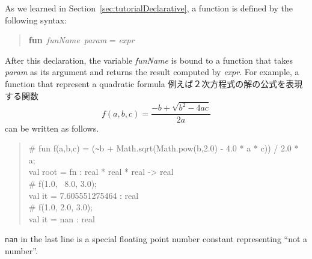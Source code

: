 \documentclass{jbook}
\newcommand{\txt}[2]{#2}
\newenvironment{program}{\begin{tt}\begin{quote}}{\end{quote}\end{tt}}
\begin{document}
\txt
{
	関数は，すでに第\ref{sec:tutorialDeclarative}節で学んだように，
\begin{program}
{\bf fun}\ {\it funName}\ {\it param} = {\it expr}
\end{program}
の構文で定義されます．
	この宣言以降，変数{\it funName}は，引数{\it param}を受け取り，式
{\it expr}の値を計算する関数として使用可能となります．
	例えば２次方程式の解の公式を表現する関数
\[
\mbox{$f(a,b,c)$} = \frac{ -b + \sqrt{ b^{2} - 4 a c } }{2 a} 
\]
は以下のように定義できます．
}
{
	As we learned in Section~\ref{sec:tutorialDeclarative}, a
function is defined by the following syntax:
\begin{program}
{\bf fun}\ {\it funName}\ {\it param} = {\it expr}
\end{program}
	After this declaration, the variable {\it funName} is bound to a
function that takes {\it param} as its argument and returns the result 
computed by {\it expr}.
	For example, a function that represent a quadratic formula
	例えば２次方程式の解の公式を表現する関数
\[
\mbox{$f(a,b,c)$} = \frac{ -b + \sqrt{ b^{2} - 4 a c } }{2 a} 
\]
can be written as follows.
}
\begin{program}
\# fun f(a,b,c) = (\verb|~|b + Math.sqrt(Math.pow(b,2.0) - 4.0 * a * c)) / 2.0 * a;\\
val root = fn : real * real * real -> real\\
\# f(1.0, ~8.0, 3.0);\\
val it = 7.605551275464 : real\\
\# f(1.0, 2.0, 3.0);\\
val it = nan : real
\end{program}
\txt
{
	最後の例{\tt nan}は，浮動小数点演算の結果正常な数が得られなかった時に返される
非数（not a number）です．
}
{
	{\tt nan} in the last line is a special floating point number
constant representing  ``not a number''.
}
\end{document}
